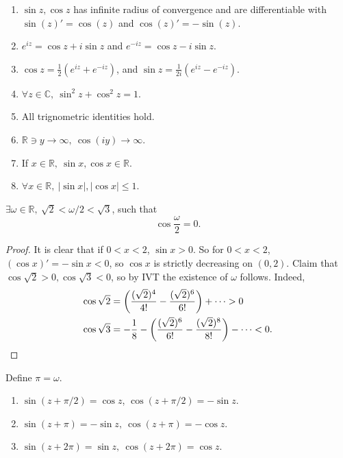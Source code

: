 \begin{sprop}
    \begin{enumerate}
        \item     $ \sin z,\cos z $ has infinite radius of convergence and are differentiable with $ \sin(z)'= \cos(z) $ and $ \cos(z)'=-\sin (z) $.
        \item $ e^{iz}=\cos z+i \sin z $ and $ e^{-iz}=\cos z-i \sin z $.
        \item $\displaystyle \cos z=\frac{1}{2}\left( e^{iz}+e^{-iz} \right)$, and $\displaystyle \sin z = \frac{1}{2i}\left( e^{iz}-e^{-iz} \right)$. 
        \item $\forall z\in \mathbb{C},\ \sin ^2 z+ \cos ^2 z=1 $.
        \item All trignometric identities hold.
        \item $ \mathbb{R}\ni y\to \infty,\ \cos(iy)\to \infty $.
        \item If $ x\in \mathbb{R},\ \sin x, \cos x\in \mathbb{R} $.
        \item $ \forall x\in \mathbb{R},\ |\sin x|,|\cos x|\le 1 $.
    \end{enumerate}
\end{sprop}

\begin{proposition}\label{prop:4.10}
    $ \exists \omega\in \mathbb{R},\ \sqrt{2}<\omega/2<\sqrt{3} $, such that 
    \[
        \cos \frac{\omega}{2}=0.
    \]
\end{proposition}
\begin{proof}
    It is clear that if $0<x<2$, $ \sin x>0 $. So for $0<x<2$, $ (\cos x)'=- \sin x<0 $, so $\cos x$ is strictly decreasing on $ (0,2) $. Claim that $ \cos \sqrt{2}>0, \cos \sqrt{3}<0 $, so by IVT the existence of $ \omega $ follows. Indeed, 
    \begin{align*}
        \cos \sqrt{2}&= \left( \frac{(\sqrt{2})^4}{4!}- \frac{(\sqrt{2})^6}{6!}\right)+\cdots>0\\ 
        \cos \sqrt{3}&= -\frac{1}{8}- \left( \frac{(\sqrt{2})^6}{6!}-\frac{(\sqrt{2})^8}{8!} \right)- \cdots <0.\qedhere
    \end{align*}
\end{proof}

\begin{definition}
    Define $ \pi=\omega $.
\end{definition}

\begin{theorem}\label{thm:4.12}
    \begin{enumerate}
        \item $ \sin (z+\pi/2)=\cos z $, $ \cos (z+\pi/2)=-\sin z $.
        \item $ \sin (z+\pi)=-\sin z,\ \cos (z+\pi)=-\cos z $.
        \item $ \sin (z+2\pi)=\sin z,\ \cos (z+2\pi)=\cos z $.
    \end{enumerate}
\end{theorem}

